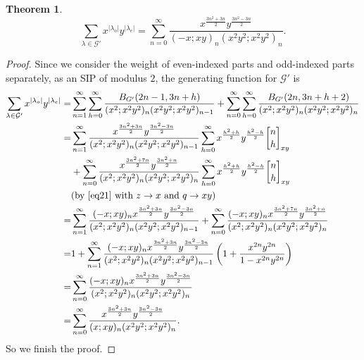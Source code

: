 \documentclass[12pt]{amsart}
\newtheorem{theorem}{Theorem}[section]
\theoremstyle{definition}
\theoremstyle{remark}
\numberwithin{equation}{section}
\begin{document}
\begin{theorem}\label{thm:GFG'xy}
\begin{equation}\label{eq:GFG'xy}
\sum_{\lambda\in\mathcal{G}'}x^{|\lambda_{o}|}y^{|\lambda_{e}|}=\sum_{n=0}^{\infty}\frac{x^{\frac{3n^2+3n}{2}}y^{\frac{3n^2-3n}{2}}}{(-x;xy)_n(x^2y^2;x^2y^2)_{n}}.
\end{equation}
\end{theorem}

\begin{proof}
Since we consider the weight of even-indexed parts and odd-indexed parts separately, as an SIP of modulus $2$, the generating function for $\mathcal{G}'$ is
\begin{align*}
\sum_{\lambda\in\mathcal{G}'}x^{|\lambda_{o}|}y^{|\lambda_{e}|}=&\sum_{n=1}^{\infty}\sum_{h=0}^{\infty}\frac{B_{G'}(2n-1,3n+h)}{(x^2;x^2y^2)_n(x^2y^2;x^2y^2)_{n-1}}+\sum_{n=0}^{\infty}\sum_{h=0}^{\infty}\frac{B_{G'}(2n,3n+h+2)}{(x^2;x^2y^2)_n(x^2y^2;x^2y^2)_{n}}\\
=&\sum_{n=1}^{\infty}\frac{x^{\frac{3n^2+3n}{2}}y^{\frac{3n^2-3n}{2}}}{(x^2;x^2y^2)_n(x^2y^2;x^2y^2)_{n-1}}\sum_{h=0}^{\infty}x^{\frac{h^2+h}{2}}y^{\frac{h^2-h}{2}}{n\brack h}_{xy}\\
&+\sum_{n=0}^{\infty}\frac{x^{\frac{3n^2+7n}{2}}y^{\frac{3n^2+n}{2}}}{(x^2;x^2y^2)_n(x^2y^2;x^2y^2)_{n}}\sum_{h=0}^{\infty}x^{\frac{h^2+h}{2}}y^{\frac{h^2-h}{2}}{n\brack h}_{xy}\\
&\text{(by~\eqref{eq21} with $z\to x$ and $q\to xy$)}\\
=&\sum_{n=1}^{\infty}\frac{(-x;xy)_{n}x^{\frac{3n^2+3n}{2}}y^{\frac{3n^2-3n}{2}}}{(x^2;x^2y^2)_n(x^2y^2;x^2y^2)_{n-1}}+\sum_{n=0}^{\infty}\frac{(-x;xy)_{n}x^{\frac{3n^2+7n}{2}}y^{\frac{3n^2+n}{2}}}{(x^2;x^2y^2)_n(x^2y^2;x^2y^2)_{n}}\\
=&1+\sum_{n=1}^{\infty}\frac{(-x;xy)_{n}x^{\frac{3n^2+3n}{2}}y^{\frac{3n^2-3n}{2}}}{(x^2;x^2y^2)_n(x^2y^2;x^2y^2)_{n-1}}\left(1+\frac{x^{2n}y^{2n}}{1-x^{2n}y^{2n}}\right)\\
=&\sum_{n=0}^{\infty}\frac{(-x;xy)_{n}x^{\frac{3n^2+3n}{2}}y^{\frac{3n^2-3n}{2}}}{(x^2;x^2y^2)_n(x^2y^2;x^2y^2)_{n}}\\
=&\sum_{n=0}^{\infty}\frac{x^{\frac{3n^2+3n}{2}}y^{\frac{3n^2-3n}{2}}}{(x;xy)_n(x^2y^2;x^2y^2)_{n}}.
\end{align*}
So we finish the proof.
\end{proof}
\end{document}
